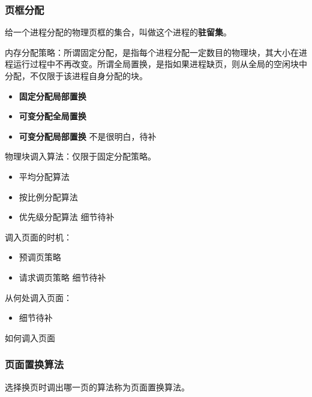 \documentclass[12pt, a4paper, oneside]{ctexart}
\begin{document}
\subsubsection{页框分配}

给一个进程分配的物理页框的集合，叫做这个进程的\textbf{驻留集}。

内存分配策略：所谓固定分配，是指每个进程分配一定数目的物理块，其大小在进程运行过程中不再改变。所谓全局置换，是指如果进程缺页，则从全局的空闲块中分配，不仅限于该进程自身分配的块。
\begin{itemize}
  \item {\bf 固定分配局部置换}
  \item {\bf 可变分配全局置换}
  \item {\bf 可变分配局部置换}
  不是很明白，待补
\end{itemize}

物理块调入算法：仅限于固定分配策略。
\begin{itemize}
  \item 平均分配算法
  \item 按比例分配算法
  \item 优先级分配算法
  细节待补
\end{itemize}

调入页面的时机：
\begin{itemize}
  \item 预调页策略
  \item 请求调页策略
  细节待补
\end{itemize}

从何处调入页面：
\begin{itemize}
  \item 细节待补
\end{itemize}

如何调入页面

\subsubsection{页面置换算法}

选择换页时调出哪一页的算法称为页面置换算法。
\end{document}
